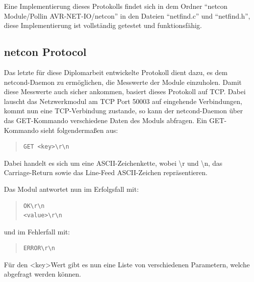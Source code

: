 \documentclass[a4paper,14pt,headsepline]{scrartcl}
\begin{document}
Eine Implementierung dieses Protokolls findet sich in dem Ordner "`netcon Module/Pollin AVR-NET-IO/netcon"' in den Dateien "`netfind.c"' und "`netfind.h"', diese Implementierung ist vollständig getestet und funktionsfähig.

\newpage

\subsection{netcon Protocol}
Das letzte für diese Diplomarbeit entwickelte Protokoll dient dazu, es dem netcond-Daemon zu ermöglichen, die Messwerte der Module einzuholen. Damit diese Messwerte auch sicher ankommen, basiert dieses Protokoll auf TCP. Dabei lauscht das Netzwerkmodul am TCP Port 50003 auf eingehende Verbindungen, kommt nun eine TCP-Verbindung zustande, so kann der netcond-Daemon über das GET-Kommando verschiedene Daten des Moduls abfragen. Ein GET-Kommando sieht folgendermaßen aus:

\begin{quote}
\begin{verbatim}
GET <key>\r\n
\end{verbatim}
\end{quote}

Dabei handelt es sich um eine ASCII-Zeichenkette, wobei \textbackslash r und \textbackslash n, das Carriage-Return sowie das Line-Feed ASCII-Zeichen repräsentieren.

Das Modul antwortet nun im Erfolgsfall mit:
\begin{quote}
\begin{verbatim}
OK\r\n
<value>\r\n
\end{verbatim}
\end{quote}
und im Fehlerfall mit:
\begin{quote}
\begin{verbatim}
ERROR\r\n
\end{verbatim}
\end{quote}

Für den \textless key\textgreater Wert gibt es nun eine Liste von verschiedenen Parametern, welche abgefragt werden können.
\end{document}
